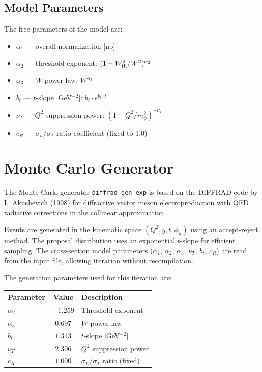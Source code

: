 \documentclass[12pt,a4paper]{article}
\begin{document}
\subsection{Model Parameters}
The free parameters of the model are:
\begin{itemize}
\item $\alpha_1$ --- overall normalization [nb]
\item $\alpha_2$ --- threshold exponent: $(1 - W_{\rm th}^2/W^2)^{\alpha_2}$
\item $\alpha_3$ --- $W$ power law: $W^{\alpha_3}$
\item $b_t$ --- $t$-slope [GeV$^{-2}$]: $b_t \cdot e^{b_t \cdot t}$
\item $\nu_T$ --- $Q^2$ suppression power: $(1 + Q^2/m_\phi^2)^{-\nu_T}$
\item $c_R$ --- $\sigma_L/\sigma_T$ ratio coefficient (fixed to 1.0)
\end{itemize}

\section{Monte Carlo Generator}
\label{sec:generator}

The Monte Carlo generator \texttt{diffrad\_gen\_exp} is based on the DIFFRAD code
by I.~Akushevich (1998) for diffractive vector meson electroproduction with QED
radiative corrections in the collinear approximation.

Events are generated in the kinematic space $(Q^2, y, t, \phi_h)$ using an
accept-reject method. The proposal distribution uses an exponential $t$-slope
for efficient sampling. The cross-section model parameters ($\alpha_1$, $\alpha_2$,
$\alpha_3$, $\nu_T$, $b_t$, $c_R$) are read from the input file, allowing
iteration without recompilation.

The generation parameters used for this iteration are:
\begin{center}
\begin{tabular}{lcl}
\toprule
Parameter & Value & Description \\
\midrule
$\alpha_2$ & $-1.259$ & Threshold exponent \\
$\alpha_3$ & $0.697$ & $W$ power law \\
$b_t$      & $1.313$ & $t$-slope [GeV$^{-2}$] \\
$\nu_T$    & $2.306$ & $Q^2$ suppression power \\
$c_R$      & $1.000$ & $\sigma_L/\sigma_T$ ratio (fixed) \\
\bottomrule
\end{tabular}
\end{center}
\end{document}
